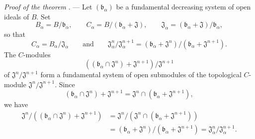 \begin{env}[19.5.6]
\label{0.19.5.6}
\emph{Proof of the theorem} . ---
Let $(\mathfrak{b}_\alpha)$ be a fundamental decreasing system of open ideals of $B$.
Set
\[
  B_\alpha=B/\mathfrak{b}_\alpha,\qquad
  C_\alpha=B/(\mathfrak{b}_\alpha+\mathfrak{J}),\qquad
  \mathfrak{J}_\alpha=(\mathfrak{b}_\alpha+\mathfrak{J})/\mathfrak{b}_\alpha,
\]
so that
\[
  C_\alpha=B_\alpha/\mathfrak{J}_\alpha
  \qquad\text{and}\qquad
  \mathfrak{J}_\alpha^n/\mathfrak{J}_\alpha^{n+1}
  =(\mathfrak{b}_\alpha+\mathfrak{J}^n)/
   (\mathfrak{b}_\alpha+\mathfrak{J}^{n+1}).
\]
The $C$-modules
\[
  ((\mathfrak{b}_\alpha\cap\mathfrak{J}^n)+\mathfrak{J}^{n+1})/
  \mathfrak{J}^{n+1}
\]
of $\mathfrak{J}^n/\mathfrak{J}^{n+1}$ form a fundamental system of open submodules of the topological $C$-module $\mathfrak{J}^n/\mathfrak{J}^{n+1}$.
Since
\[
  (\mathfrak{b}_\alpha\cap\mathfrak{J}^n)+\mathfrak{J}^{n+1}
  =\mathfrak{J}^n\cap(\mathfrak{b}_\alpha+\mathfrak{J}^{n+1}),
\]
we have
\[
\begin{aligned}
  \mathfrak{J}^n/((\mathfrak{b}_\alpha\cap\mathfrak{J}^n)+\mathfrak{J}^{n+1})
  &=
  \mathfrak{J}^n/(\mathfrak{J}^n\cap(\mathfrak{b}_\alpha+\mathfrak{J}^{n+1}))\\
  &=
  (\mathfrak{b}_\alpha+\mathfrak{J}^n)/
  (\mathfrak{b}_\alpha+\mathfrak{J}^{n+1})
  =\mathfrak{J}_\alpha^n/\mathfrak{J}_\alpha^{n+1}.
\end{aligned}
\]
\end{env}

